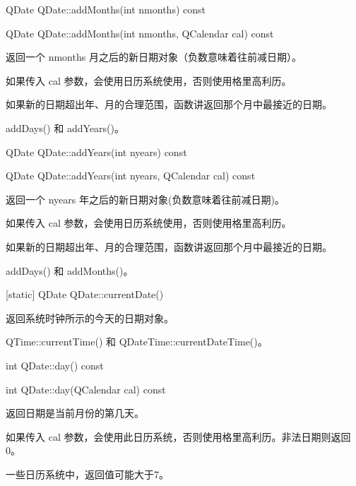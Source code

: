 \splitLine

QDate QDate::addMonths(int nmonths) const

QDate QDate::addMonths(int nmonths, QCalendar cal) const

返回一个 nmonths 月之后的新日期对象（负数意味着往前减日期）。

如果传入 cal 参数，会使用日历系统使用，否则使用格里高利历。


\begin{notice}
如果新的日期超出年、月的合理范围，函数讲返回那个月中最接近的日期。
\end{notice}

\begin{notice}[另请参阅]
addDays() 和 addYears()。
\end{notice}

\splitLine

QDate QDate::addYears(int nyears) const

QDate QDate::addYears(int nyears, QCalendar cal) const

返回一个 nyears 年之后的新日期对象(负数意味着往前减日期)。

如果传入 cal 参数，会使用日历系统使用，否则使用格里高利历。



\begin{notice}
如果新的日期超出年、月的合理范围，函数讲返回那个月中最接近的日期。
\end{notice}

\begin{notice}[另请参阅]
addDays() 和 addMonths()。
\end{notice}


\splitLine

[static] QDate QDate::currentDate()

返回系统时钟所示的今天的日期对象。



\begin{notice}[另请参阅]
QTime::currentTime() 和 QDateTime::currentDateTime()。
\end{notice}

\splitLine

int QDate::day() const

int QDate::day(QCalendar cal) const

返回日期是当前月份的第几天。

如果传入 cal 参数，会使用此日历系统，否则使用格里高利历。非法日期则返回0。

一些日历系统中，返回值可能大于7。

